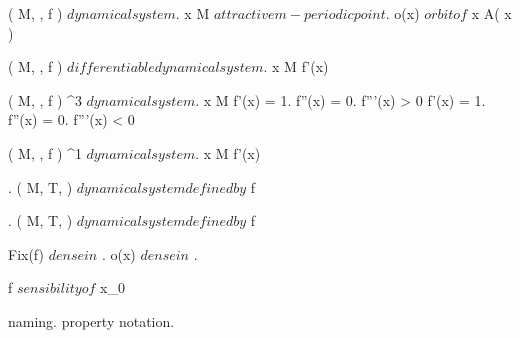 \documentclass[../Main/main]{subfiles}
\begin{document}
{	
	{
		{
			( M, \N, f ) $ dynamical system $.
			x \in M $ attractive m-periodic point $.
			o(x) $ orbit of $ x
		}
		{
		}
		\denote
		{
			A( x )
		}
	}
	
	
	{
		{
			( M, \N, f ) $ differentiable dynamical system $.
			x \in M
		}
		{
			f'(x) \in {}
		}
	}


	{
		{
			( M, \N, f ) \; \Cc^3 $ dynamical system $.
			x \in M
		}
		{
			f'(x) = 1.
			f''(x) = 0.
			f'''(x) > 0
		}
		{
			f'(x) = 1.
			f''(x) = 0.
			f'''(x) < 0
		}
	}
	
	
	{
		{
			( M, \N, f ) \Cc^1 $ dynamical system $.
			x \in M
		}
		{
			f'(x)
		}
	}
	
	
	{
		{
			.
			( M, T, \phi ) $ dynamical system defined by $ f
		}
		{
			{
			}
		}
	}
	
	
	{
		{
			.
			( M, T, \phi ) $ dynamical system defined by $ f
		}
		{
			Fix(f) $ dense in $ \R.
			{
				o(x) $ dense in $ \R
			}.

			f $ sensibility of $ x_0
		}
	}


	{
		{
			naming.
		}
		\denote
		{
			property \as notation.
		}
	}
	
	
	
	
	
	
	
	
	
	

}
\end{document}
